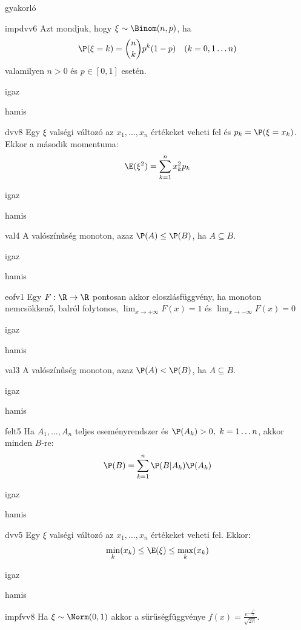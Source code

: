 \documentclass[12pt]{article}
\begin{document}
\begin{quiz}{gyakorló}
\begin{multi}[feedback={Def.}]{impdvv6}
Azt mondjuk, hogy $\xi\sim \Binom(n,p)$, ha 
$$
\P(\xi=k)=\binom{n}{k}p^k(1-p)\ \ \ (k=0,1\ldots n)
$$
valamilyen $n>0$ és $p\in[0,1]$ esetén.
\item igaz
\item* hamis
\end{multi}
\begin{multi}[feedback={Def.}]{dvv8}
Egy $\xi$ valségi változó az $x_1,\ldots, x_n$ értékeket veheti fel és $p_k=\P(\xi=x_k)$. 
Ekkor a második momentuma:
$$
\E(\xi^2)=\sum_{k=1}^n x_k^2 p_k
$$
\item* igaz
\item hamis
\end{multi}
\begin{multi}[feedback={$B=A\cup (B\setminus A)$+additívitás}]{val4}
A valószínűség monoton, azaz $\P(A)\le \P(B)$, ha $A\subseteq B$.
\item* igaz
\item hamis
\end{multi}
\begin{multi}[feedback={Def.}]{eofv1}
Egy $F:\R\to \R$ pontosan akkor eloszlásfüggvény, ha monoton nemcsökkenő, 
balról folytonos, $\lim_{x\to+\infty}F(x)=1$ és $\lim_{x\to-\infty}F(x)=0$
\item* igaz
\item hamis
\end{multi}
\begin{multi}[feedback={$A=B$?}]{val3}
A valószínűség monoton, azaz $\P(A)<\P(B)$, ha $A\subseteq B$.
\item igaz
\item* hamis
\end{multi}
\begin{multi}[feedback={Teljes valség tétele.}]{felt5}
Ha $A_1,\ldots,A_n$ teljes eseményrendszer és $\P(A_k)>0,\ k=1\ldots n$, akkor minden $B$-re:
$$
\P(B)=\sum_{k=1}^n \P(B|A_k)\P(A_k)
$$
\item* igaz
\item hamis
\end{multi}
\begin{multi}[feedback={Az adott feltételek mellet a várható érték egy súlyozott közép.}]{dvv5}
Egy $\xi$ valségi változó az $x_1,\ldots, x_n$ értékeket veheti fel. Ekkor:
$$
\min_k(x_k)\le \E(\xi) \le \max_k(x_k)
$$
\item* igaz
\item hamis
\end{multi}
\begin{multi}[feedback={Def.}]{impfvv8}
Ha $\xi\sim \Norm(0,1)$ akkor a sűrűségfüggvénye $f(x)=\frac{e^{-\frac{x^2}{2}}}{\sqrt{2\pi}}$.

\end{multi}
\end{quiz}
\end{document}
